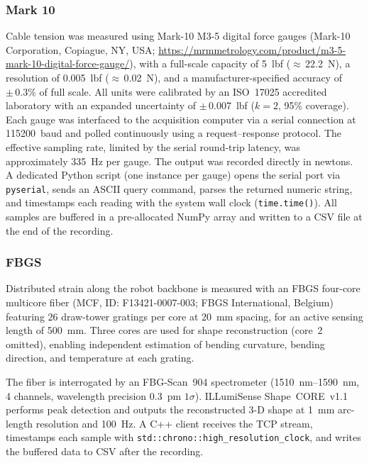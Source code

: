 \documentclass[14pt, a4paper]{article}
\begin{document}
\subsubsection{Mark 10}


Cable tension was measured using Mark-10 M3-5 digital force gauges (Mark-10 Corporation, Copiague, NY, USA; \url{https://mrmmetrology.com/product/m3-5-mark-10-digital-force-gauge/}), with a full-scale capacity of \SI{5}{lbf} ($\approx$\,\SI{22.2}{\newton}), a resolution of \SI{0.005}{lbf} ($\approx$\,\SI{0.02}{\newton}), and a manufacturer-specified accuracy of $\pm\,0.3\%$ of full scale.
All units were calibrated by an ISO~17025 accredited laboratory
with an expanded uncertainty of $\pm$\,\SI{0.007}{lbf} ($k{=}2$, 95\% coverage).
Each gauge was interfaced to the acquisition computer via a serial connection
at \SI{115200}{baud} and polled continuously using a request--response protocol.
The effective sampling rate, limited by the serial round-trip latency, was
approximately \SI{335}{\hertz} per gauge.
The output was recorded directly in newtons.
A dedicated Python script (one instance per gauge) opens the serial port via \texttt{pyserial},
sends an ASCII query command, parses the returned numeric string, and timestamps each reading with the system wall clock (\texttt{time.time()}).
All samples are buffered in a pre-allocated NumPy array and written to a CSV file at the end
of the recording.



\subsubsection{FBGS}
\label{sec:fbgs}


Distributed strain along the robot backbone is measured with an FBGS four-core multicore fiber
(MCF, ID: F13421-0007-003; FBGS International, Belgium) featuring 26 draw-tower gratings per
core at \SI{20}{\milli\meter} spacing, for an active sensing length of \SI{500}{\milli\meter}.
Three cores are used for shape reconstruction (core~2 omitted), enabling independent estimation
of bending curvature, bending direction, and temperature at each grating.

The fiber is interrogated by an FBG-Scan~904 spectrometer (\SIrange{1510}{1590}{\nano\meter},
4 channels, wavelength precision \SI{0.3}{\pico\meter} $1\sigma$).
ILLumiSense Shape~CORE~v1.1 performs peak detection and outputs the reconstructed 3-D shape
at \SI{1}{\milli\meter} arc-length resolution and \SI{100}{\hertz}.
A C++ client receives the TCP stream, timestamps each sample with
\texttt{std::chrono::high\_resolution\_clock}, and writes the buffered data to CSV after
the recording.
\end{document}
